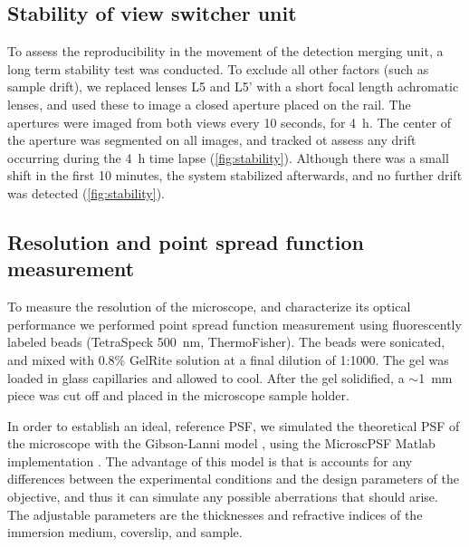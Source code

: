   \subsection{Stability of view switcher unit}
    \label{sec:mirrorStability}
    To assess the reproducibility in the movement of the detection merging unit, a long term stability test was conducted. To exclude all other factors (such as sample drift), we replaced lenses L5 and L5' with a short focal length achromatic lenses, and used these to image a closed aperture placed on the rail. The apertures were imaged from both views every 10 seconds, for \SI{4}{h}. The center of the aperture was segmented on all images, and tracked ot assess any drift occurring during the \SI{4}{h} time lapse (\autoref{fig:stability}). Although there was a small shift in the first 10 minutes, the system stabilized afterwards, and no further drift was detected (\autoref{fig:stability}).


  \subsection{Resolution and point spread function measurement}
    To measure the resolution of the microscope, and characterize its optical performance we performed point spread function measurement using fluorescently labeled beads (TetraSpeck \SI{500}{nm}, ThermoFisher). The beads were sonicated, and mixed with 0.8\% GelRite solution at a final dilution of 1:1000. The gel was loaded in glass capillaries and allowed to cool. After the gel solidified, a $\sim$\SI{1}{mm} piece was cut off and placed in the microscope sample holder.

    In order to establish an ideal, reference PSF, we simulated the theoretical PSF of the microscope with the Gibson-Lanni model \cite{gibson_experimental_1992}, using the MicroscPSF Matlab implementation \cite{li_fast_2017}. The advantage of this model is that is accounts for any differences between the experimental conditions and the design parameters of the objective, and thus it can simulate any possible aberrations that should arise. The adjustable parameters are the thicknesses and refractive indices of the immersion medium, coverslip, and sample. 


